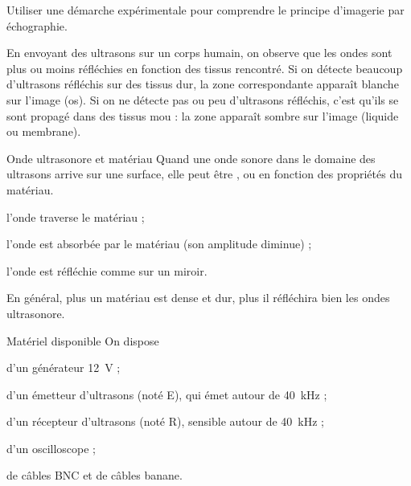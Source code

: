 \teteTermStssImag
{}

\begin{objectifs}
  \item Utiliser une démarche expérimentale pour comprendre le principe d'imagerie par échographie.
\end{objectifs}

\begin{contexte}
  En envoyant des ultrasons sur un corps humain, on observe que les ondes sont plus ou moins réfléchies en fonction des tissus rencontré.
  Si on détecte beaucoup d'ultrasons réfléchis sur des tissus dur, la zone correspondante apparaît blanche sur l’image (os).
  Si on ne détecte pas ou peu d’ultrasons réfléchis, c’est qu’ils se sont propagé dans des tissus mou : la zone apparaît sombre sur l’image (liquide ou membrane).
  
\end{contexte}


\begin{doc}{Onde ultrasonore et matériau}
  Quand une onde sonore dans le domaine des ultrasons arrive sur une surface,
  elle peut être ,  ou  en fonction des propriétés du matériau.
  \begin{listePoints}
    \item {} l'onde traverse le matériau ;
    \item {} l'onde est absorbée par le matériau (son amplitude diminue) ;
    \item {} l'onde est réfléchie comme sur un miroir.
  \end{listePoints}

  En général, plus un matériau est dense et dur, plus il réfléchira bien les ondes ultrasonore.
\end{doc}

\begin{doc}{Matériel disponible}
  On dispose 
  \begin{listeTirets}
    \item d'un générateur \qty{12}{\volt} ;
    \item d'un émetteur d'ultrasons (noté E), qui émet autour de \qty{40}{\kilo\hertz} ;
    \item d'un récepteur d'ultrasons (noté R), sensible autour de \qty{40}{\kilo\hertz} ;
    \item d'un oscilloscope ;
    \item de câbles BNC et de câbles banane.
  \end{listeTirets}
\end{doc}

